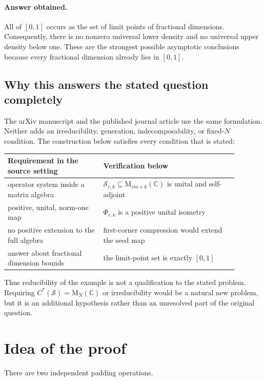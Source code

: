 \documentclass[11pt]{article}
\theoremstyle{remark}
\newcommand{\C}{\mathbb C}
\newcommand{\M}{\mathrm M}
\begin{document}
\paragraph{Answer obtained.}
All of $[0,1]$ occurs as the set of limit points of fractional dimensions.  Consequently, there is no nonzero universal lower density and no universal upper density below one.  These are the strongest possible asymptotic conclusions because every fractional dimension already lies in $[0,1]$.

\subsection*{Why this answers the stated question completely}

The arXiv manuscript and the published journal article use the same formulation.  Neither adds an irreducibility, generation, indecomposability, or fixed-$N$ condition.  The construction below satisfies every condition that is stated:

\begin{center}
\begin{tabular}{@{}p{0.37\linewidth}p{0.52\linewidth}@{}}
\toprule
\textbf{Requirement in the source setting} & \textbf{Verification below} \\
\midrule
operator system inside a matrix algebra & $\mathcal S_{r,k}\subseteq\M_{rm+k}(\C)$ is unital and self-adjoint \\
positive, unital, norm-one map & $\Phi_{r,k}$ is a positive unital isometry \\
no positive extension to the full algebra & first-corner compression would extend the seed map \\
answer about fractional dimension bounds & the limit-point set is exactly $[0,1]$ \\
\bottomrule
\end{tabular}
\end{center}

Thus reducibility of the example is not a qualification to the stated problem.  Requiring $C^*(\mathcal S)=\M_N(\C)$ or irreducibility would be a natural new problem, but it is an additional hypothesis rather than an unresolved part of the original question.

\section{Idea of the proof}

There are two independent padding operations.
\end{document}
